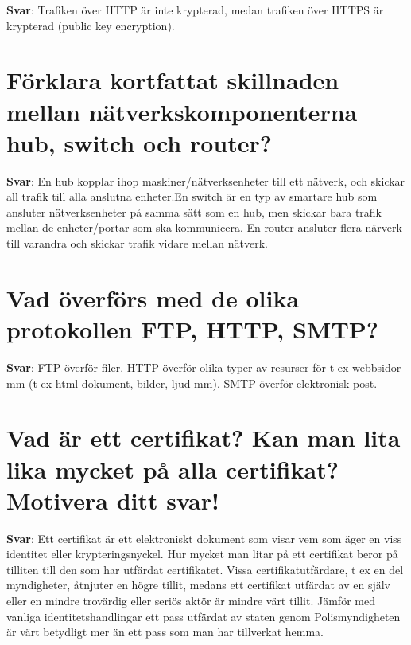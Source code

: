 \documentclass[a4paper,11pt,oneside]{book}
\begin{document}
\begin{sloppypar}
\label{q:152:sa:sv:True}

\textbf{Svar}: Trafiken \"over HTTP \"ar inte krypterad, medan trafiken \"over HTTPS \"ar krypterad (public key encryption).



\section{F\"orklara kortfattat skillnaden mellan n\"atverkskomponenterna hub, switch och router?}

\label{q:153:sa:sv:True}

\textbf{Svar}: En hub kopplar ihop maskiner/n\"atverksenheter till ett n\"atverk, och skickar all trafik till alla anslutna enheter.En switch \"ar en typ av smartare hub som ansluter n\"atverksenheter p\r{a} samma s\"att som en hub, men skickar bara trafik mellan de enheter/portar som ska kommunicera. En router ansluter flera n\"arverk till varandra och skickar trafik vidare mellan n\"atverk.



\section{Vad \"overf\"ors med de olika protokollen FTP, HTTP, SMTP?}

\label{q:154:sa:sv:True}

\textbf{Svar}: FTP \"overf\"or filer. HTTP \"overf\"or olika typer av resurser f\"or t ex webbsidor mm (t ex html-dokument, bilder, ljud mm). SMTP \"overf\"or elektronisk post.



\section{Vad \"ar ett certifikat? Kan man lita lika mycket p\r{a} alla certifikat? Motivera ditt svar!}

\label{q:155:sa:sv:True}

\textbf{Svar}: Ett certifikat \"ar ett elektroniskt dokument som visar vem som \"ager en viss identitet eller krypteringsnyckel. Hur mycket man litar p\r{a} ett certifikat beror p\r{a} tilliten till den som har utf\"ardat certifikatet. Vissa certifikatutf\"ardare, t ex en del myndigheter, \r{a}tnjuter en h\"ogre tillit, medans ett certifikat utf\"ardat av en sj\"alv eller en mindre trov\"ardig eller seri\"os akt\"or \"ar mindre v\"art tillit. J\"amf\"or med vanliga identitetshandlingar {\textendash} ett pass utf\"ardat av staten genom Polismyndigheten \"ar v\"art betydligt mer \"an ett pass som man har tillverkat hemma.




\end{sloppypar}
\end{document}
